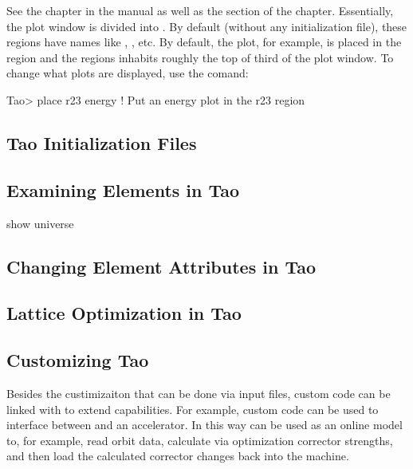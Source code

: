\documentclass{report}
\begin{document}
See the  chapter in the  manual as well as the  section of the  chapter. Essentially, the plot window is
divided into . By default (without any initialization file), these regions
have names like , , etc. By default, the  plot, for example, is
placed in the  region and the  regions inhabits roughly the top of third
of the plot window. To change what plots are displayed, use the  comand:
\begin{example}
  Tao> place r23 energy  ! Put an energy plot in the r23 region
\end{example}

\subsection{Tao Initialization Files}



\subsection{Examining Elements in Tao}

show universe

\subsection{Changing Element Attributes in Tao}

\subsection{Lattice Optimization in Tao}


\subsection{Customizing Tao}

Besides the custimizaiton that can be done via  input files,  custom code
can be linked with  to extend  capabilities. For example, custom code can
be used to interface between  and an accelerator. In this way  can be used
as an online model to, for example, read orbit data, calculate via optimization corrector
strengths, and then load the calculated corrector changes back into the machine.
\end{document}
